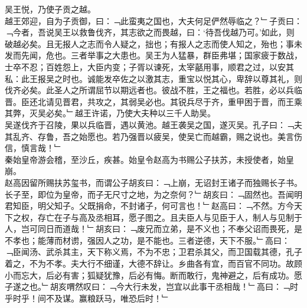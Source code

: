 {吴王悦，乃使子贡之越。\\
越王郊迎，自为子贡御，曰：﹁此蛮夷之国也，大夫何足俨然辱临之？﹂子贡曰：﹁今者，吾说吴王以救鲁伐齐，其志欲之而畏越，曰：‘待吾伐越乃可。’如此，则破越必矣。且无报人之志而令人疑之，拙也；有报人之志而使人知之，殆也；事未发而先闻，危也。三者举事之大患也。吴王为人猛暴，群臣弗堪；国家疲于数战，士卒不忍；百姓怨上，大臣内变；子胥以谏死，太宰嚭用事，顺君之过，以安其私：此王报吴之时也。诚能发卒佐之以激其志，重宝以悦其心，卑辞以尊其礼，则伐齐必矣。此圣人之所谓屈节以期远者也。彼战不胜，王之福也。若胜，必以兵临晋。臣还北请见晋君，共攻之，其弱吴必也。其锐兵尽于齐，重甲困于晋，而王乘其弊，灭吴必矣。﹂越王许诺，乃使大夫种以三千人助吴。\\
吴遂伐齐于召陵，果以兵临晋，遇以黄池。越王袭吴之国，遂灭吴。孔子曰：﹁夫其乱齐、存鲁，吾之始愿也。若乃强晋以疲吴，使吴亡而越霸，赐之说也。美言伤信，慎言哉！﹂}\\
秦始皇帝游会稽，至沙丘，疾甚。始皇令赵高为书赐公子扶苏，未授使者，始皇崩。\\
赵高因留所赐扶苏玺书，而谓公子胡亥曰：﹁上崩，无诏封王诸子而独赐长子书。长子至，即位为皇帝，而子无尺寸之地，为之奈何？﹂胡亥曰：﹁固然也。吾闻明君知臣，明父知子。父既捐命，不封诸子，何可言也！﹂赵高曰：﹁不然。方今天下之权，存亡在子与高及丞相耳，愿子图之。且夫臣人与见臣于人，制人与见制于人，岂可同日而道哉！﹂胡亥曰：﹁废兄而立弟，是不义也；不奉父诏而畏死，是不孝也；能薄而材谫，强因人之功，是不能也。三者逆德，天下不服。﹂高曰：﹁臣闻汤、武杀其主，天下称义焉，不为不忠；卫君杀其父，而卫国载其德，孔子着之，不为不孝。夫大行不细谨，大德不辞让。乡曲各有宜，而百官不同功。故顾小而忘大，后必有害；狐疑犹豫，后必有悔。断而敢行，鬼神避之，后有成功。愿子遂之也。﹂胡亥喟然叹曰：﹁今大行未发，岂宜以此事干丞相哉！﹂高曰：﹁时乎时乎！间不及谋。赢粮跃马，唯恐后时！﹂\\
